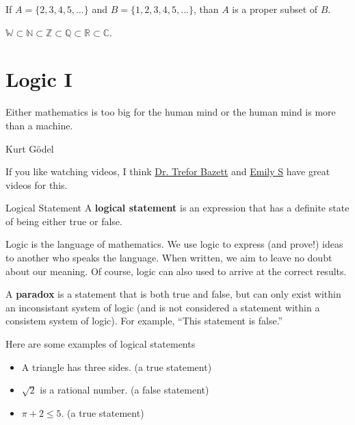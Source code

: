 \begin{boxexample}{}{}
	If $A=\{2,3,4,5,\dots\}$ and $B=\{1,2,3,4,5,\dots\}$, than $A$ is a proper subset of $B$.
\end{boxexample}

\begin{boxexample}{}{}
	$\mathbb{W} \subset \mathbb{N} \subset \mathbb{Z} \subset \mathbb{Q} \subset \mathbb{R} \subset \mathbb{C}$.
\end{boxexample}

\chapter{Logic I}

\epigraph{Either mathematics is too big for the human mind or the human mind is more than a machine.}{Kurt Gödel}

If you like watching videos, I think \href{https://www.youtube.com/watch?v=SrU9YDoXE88}{Dr. Trefor Bazett} and \href{https://www.youtube.com/watch?v=wRMC-ttjhwM}{Emily S} have great videos for this.

\begin{boxdefine}{Logical Statement}{}
A {\bf logical statement} is an expression that has a definite state of being either true or false.
\end{boxdefine}

Logic is the language of mathematics. We use logic to express (and prove!) ideas to another who speaks the language. When written, we aim to leave no doubt about our meaning. Of course, logic can also used to arrive at the correct results.

\begin{boxremark*}{}{}
	A {\bf paradox} is a statement that is both true and false, but can only exist within an inconsistant system of logic (and is not considered a statement within a consistem system of logic). For example, ``This statement is false.''
\end{boxremark*}

\begin{boxexample}{}{}
	Here are some examples of logical statements
	\begin{itemize}
		\item A triangle has three sides. (a true statement)
		\item $\sqrt 2$ is a rational number. (a false statement)
		\item $\pi + 2 \leq 5$. (a true statement)
	\end{itemize}
\end{boxexample}

